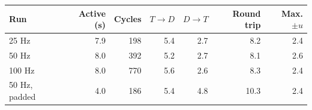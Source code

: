 \begin{tabular}{@{}lrrrrrr@{}}
\toprule
Run & Active (s) & Cycles & $T\to D$ & $D\to T$ & Round trip & Max. $\pm u$ \\
\midrule
25 Hz & 7.9 & 198 & 5.4 & 2.7 & 8.2 & 2.4 \\
50 Hz & 8.0 & 392 & 5.2 & 2.7 & 8.1 & 2.6 \\
100 Hz & 8.0 & 770 & 5.6 & 2.6 & 8.3 & 2.4 \\
50 Hz, padded & 4.0 & 186 & 5.4 & 4.8 & 10.3 & 2.4 \\
\bottomrule
\end{tabular}
